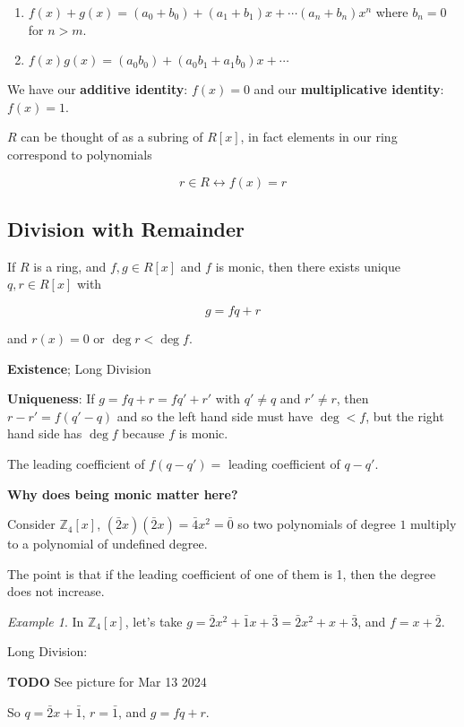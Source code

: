 \documentclass[12pt]{article}
\def\Z{{\mathbb Z}}
\def\TODO{\color{red}\textbf{TODO}\color{black}}
\theoremstyle{remark}
\theoremstyle{remark}
\theoremstyle{remark}
\newtheorem{example}{Example}
\theoremstyle{remark}
\theoremstyle{remark}
\begin{document}
\begin{enumerate}
  \item $f(x) + g(x) = (a_0 + b_0) + (a_1 + b_1)x + \cdots (a_n + b_n)x^n$ where
    $b_n = 0$ for $n > m$.

  \item $f(x)g(x) = (a_0 b_0) + (a_0 b_1 + a_1 b_0)x + \cdots $
\end{enumerate}

We have our {\bf additive identity}: $f(x) = 0$ and our {\bf multiplicative
identity}: $f(x) = 1$.

$R$ can be thought of as a subring of $R[x]$, in fact elements in our ring
correspond to polynomials

\[
  r \in R \leftrightarrow f(x) = r
\]

\subsection{Division with Remainder}

If $R$ is a ring, and $f, g \in R[x]$ and $f$ is monic, then there exists unique
$q, r \in R[x]$ with

\[
  g = fq + r
\]

and $r(x) = 0$ or $\deg r < \deg f$.

{\bf Existence}; Long Division

{\bf Uniqueness}: If $g = fq + r = fq' + r'$ with $q' \ne q$ and $r' \ne r$,
then $r - r' = f(q' - q)$ and so the left hand side must have $\deg < f$, but
the right hand side has $\deg f$ because $f$ is monic.

The leading coefficient of $f(q - q') = $ leading coefficient of $q - q'$.

{\bf Why does being monic matter here?} 

Consider $\Z_4[x]$, $(\bar 2 x)(\bar 2 x) = \bar 4 x^2 = \bar 0$ so two
polynomials of degree $1$ multiply to a polynomial of undefined degree.

The point is that if the leading coefficient of one of them is 1, then the
degree does not increase.

\begin{example}
  In $\Z_4[x]$, let's take $g = \bar 2 x^2 + \bar 1 x + \bar 3 = \bar 2 x^2 + x
  + \bar 3$, and $f = x + \bar 2$.

  Long Division:

  \TODO{} See picture for Mar 13 2024

  So $q = \bar 2 x + \bar 1$, $r = \bar 1$, and $g = fq + r$.
\end{example}
\end{document}
